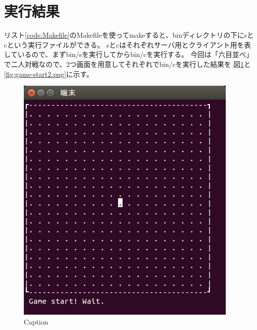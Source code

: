 \documentclass[a4j, titlepage, 10pt]{jsarticle}
\begin{document}
\lstset{ numbers = left }



\section{実行結果}

リスト\ref{code:Makefile}のMakefileを使ってmakeすると、binディレクトリの下にsとcという実行ファイルができる。
sとcはそれぞれサーバ用とクライアント用を表しているので、まずbin/sを実行してからbin/cを実行する。
今回は「六目並べ」で二人対戦なので、2つ画面を用意してそれぞれでbin/cを実行した結果を
図\ref{fig:game-start1.png}と\ref{fig:game-start2.png}に示す。

\begin{figure}[H]
  \begin{minipage}{0.5\hsize}
    \centering
    \includegraphics[scale=0.5]{img/game-start1.png}
    \caption{Caption}
    \label{fig:game-start1.png}
  \end{minipage}
  \begin{minipage}{0.5\hsize}

\end{minipage}
\end{figure}
\end{document}

